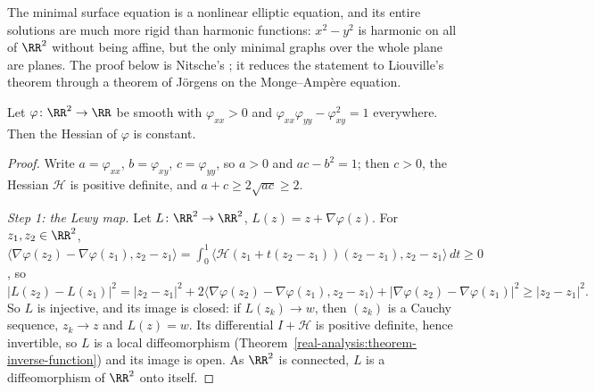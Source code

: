 The minimal surface equation is a nonlinear elliptic equation, and its entire solutions are much more rigid than harmonic functions: $x^2 - y^2$ is harmonic on all of
$\RR^2$ without being affine, but the only minimal graphs over the whole plane are planes. The proof below is Nitsche's \cite{nitsche-1957}; it reduces the statement to
Liouville's theorem through a theorem of J\"orgens on the Monge--Amp\`ere equation.

\begin{lemma}[J\"orgens]\label{riemannian-geometry:lemma-jorgens}
Let $\varphi \colon \RR^2 \to \RR$ be smooth with $\varphi_{xx} > 0$ and $\varphi_{xx}\varphi_{yy} - \varphi_{xy}^2 = 1$ everywhere. Then the Hessian of $\varphi$ is constant.
\end{lemma}

\begin{proof}
Write $a = \varphi_{xx}$, $b = \varphi_{xy}$, $c = \varphi_{yy}$, so $a > 0$ and $ac - b^2 = 1$; then $c > 0$, the Hessian $\mathcal{H}$ is positive definite, and
$a + c \geq 2\sqrt{ac} \geq 2$.

\emph{Step 1: the Lewy map.} Let $L \colon \RR^2 \to \RR^2$, $L(z) = z + \nabla\varphi(z)$. For $z_1, z_2 \in \RR^2$,
$\langle\nabla\varphi(z_2) - \nabla\varphi(z_1), z_2 - z_1\rangle = \int_0^1\langle\mathcal{H}(z_1 + t(z_2 - z_1))(z_2 - z_1), z_2 - z_1\rangle\,dt \geq 0$, so
\[
|L(z_2) - L(z_1)|^2 = |z_2 - z_1|^2 + 2\langle\nabla\varphi(z_2) - \nabla\varphi(z_1), z_2 - z_1\rangle + |\nabla\varphi(z_2) - \nabla\varphi(z_1)|^2 \geq |z_2 - z_1|^2 .
\]
So $L$ is injective, and its image is closed: if $L(z_k) \to w$, then $(z_k)$ is a Cauchy sequence, $z_k \to z$ and $L(z) = w$. Its differential $I + \mathcal{H}$ is positive
definite, hence invertible, so $L$ is a local diffeomorphism (Theorem~\ref{real-analysis:theorem-inverse-function}) and its image is open. As $\RR^2$ is connected, $L$ is a
diffeomorphism of $\RR^2$ onto itself.


\end{proof}
